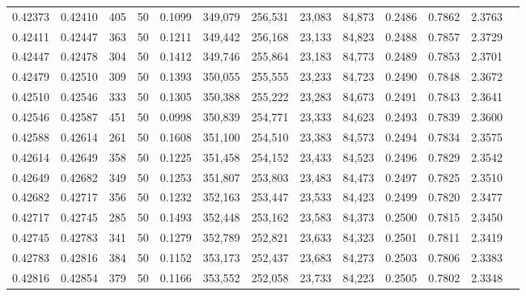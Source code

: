 \begin{tabular}{rrrrrrrrrrrrr}
0.42373 & 0.42410 &   405 &  50 &                                     0.1099 & 349,079 & 256,531 &  23,083 &  84,873 & 0.2486 & 0.7862 & 2.3763 \\
0.42411 & 0.42447 &   363 &  50 &                                     0.1211 & 349,442 & 256,168 &  23,133 &  84,823 & 0.2488 & 0.7857 & 2.3729 \\
0.42447 & 0.42478 &   304 &  50 &                                     0.1412 & 349,746 & 255,864 &  23,183 &  84,773 & 0.2489 & 0.7853 & 2.3701 \\
0.42479 & 0.42510 &   309 &  50 &                                     0.1393 & 350,055 & 255,555 &  23,233 &  84,723 & 0.2490 & 0.7848 & 2.3672 \\
0.42510 & 0.42546 &   333 &  50 &                                     0.1305 & 350,388 & 255,222 &  23,283 &  84,673 & 0.2491 & 0.7843 & 2.3641 \\
0.42546 & 0.42587 &   451 &  50 &                                     0.0998 & 350,839 & 254,771 &  23,333 &  84,623 & 0.2493 & 0.7839 & 2.3600 \\
0.42588 & 0.42614 &   261 &  50 &                                     0.1608 & 351,100 & 254,510 &  23,383 &  84,573 & 0.2494 & 0.7834 & 2.3575 \\
0.42614 & 0.42649 &   358 &  50 &                                     0.1225 & 351,458 & 254,152 &  23,433 &  84,523 & 0.2496 & 0.7829 & 2.3542 \\
0.42649 & 0.42682 &   349 &  50 &                                     0.1253 & 351,807 & 253,803 &  23,483 &  84,473 & 0.2497 & 0.7825 & 2.3510 \\
0.42682 & 0.42717 &   356 &  50 &                                     0.1232 & 352,163 & 253,447 &  23,533 &  84,423 & 0.2499 & 0.7820 & 2.3477 \\
0.42717 & 0.42745 &   285 &  50 &                                     0.1493 & 352,448 & 253,162 &  23,583 &  84,373 & 0.2500 & 0.7815 & 2.3450 \\
0.42745 & 0.42783 &   341 &  50 &                                     0.1279 & 352,789 & 252,821 &  23,633 &  84,323 & 0.2501 & 0.7811 & 2.3419 \\
0.42783 & 0.42816 &   384 &  50 &                                     0.1152 & 353,173 & 252,437 &  23,683 &  84,273 & 0.2503 & 0.7806 & 2.3383 \\
0.42816 & 0.42854 &   379 &  50 &                                     0.1166 & 353,552 & 252,058 &  23,733 &  84,223 & 0.2505 & 0.7802 & 2.3348 \\

\end{tabular}
